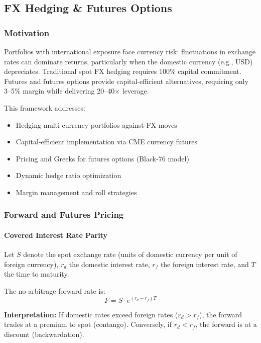 \subsection{FX Hedging \& Futures Options}

\subsubsection{Motivation}

Portfolios with international exposure face currency risk: fluctuations in exchange rates can dominate returns, particularly when the domestic currency (e.g., USD) depreciates. Traditional spot FX hedging requires 100\% capital commitment. Futures and futures options provide capital-efficient alternatives, requiring only 3--5\% margin while delivering 20--40$\times$ leverage.

This framework addresses:
\begin{itemize}
  \item Hedging multi-currency portfolios against FX moves
  \item Capital-efficient implementation via CME currency futures
  \item Pricing and Greeks for futures options (Black-76 model)
  \item Dynamic hedge ratio optimization
  \item Margin management and roll strategies
\end{itemize}

\subsubsection{Forward and Futures Pricing}

\paragraph{Covered Interest Rate Parity}

Let $S$ denote the spot exchange rate (units of domestic currency per unit of foreign currency), $r_d$ the domestic interest rate, $r_f$ the foreign interest rate, and $T$ the time to maturity.

The no-arbitrage forward rate is:
\[
F = S \cdot e^{(r_d - r_f) T}
\]

\textbf{Interpretation:} If domestic rates exceed foreign rates ($r_d > r_f$), the forward trades at a premium to spot (contango). Conversely, if $r_d < r_f$, the forward is at a discount (backwardation).

